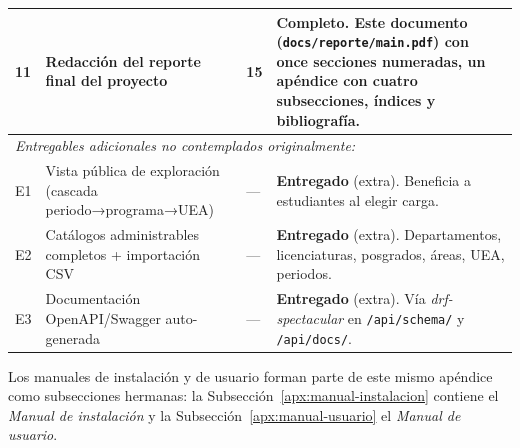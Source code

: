 \begin{longtable}{p{} p{} p{} p{}}
    \midrule
    11 & Redacción del reporte final del proyecto & 15 & \textbf{Completo}. Este documento (\texttt{docs/reporte/main.pdf}) con once secciones numeradas, un apéndice con cuatro subsecciones, índices y bibliografía. \\
    \midrule
    \multicolumn{4}{l}{\emph{Entregables adicionales no contemplados originalmente:}} \\
    \midrule
    E1 & Vista pública de exploración (cascada periodo→programa→UEA) & --- & \textbf{Entregado} (extra). Beneficia a estudiantes al elegir carga. \\
    \midrule
    E2 & Catálogos administrables completos + importación CSV & --- & \textbf{Entregado} (extra). Departamentos, licenciaturas, posgrados, áreas, UEA, periodos. \\
    \midrule
    E3 & Documentación OpenAPI/Swagger auto-generada & --- & \textbf{Entregado} (extra). Vía \emph{drf-spectacular} en \texttt{/api/schema/} y \texttt{/api/docs/}. \\
    \bottomrule
\end{longtable}

Los manuales de instalación y de usuario forman parte de este mismo apéndice como subsecciones hermanas: la Subsección~\ref{apx:manual-instalacion} contiene el \emph{Manual de instalación} y la Subsección~\ref{apx:manual-usuario} el \emph{Manual de usuario}.